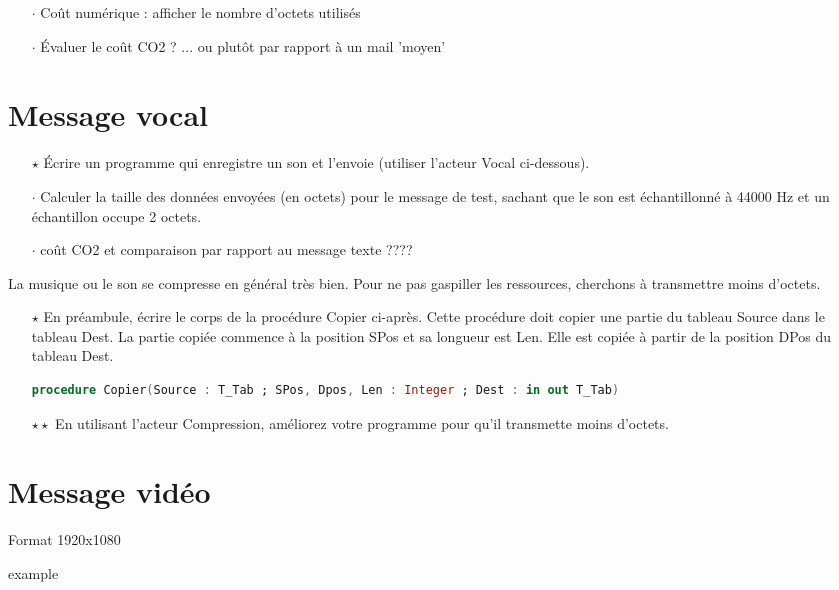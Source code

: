 \documentclass[a4paper]{article}
\begin{document}



\begin{itemize}[itemsep=0.2ex]
\item[$\cdot$] Coût numérique : afficher le nombre d'octets utilisés
\item[$\cdot$] Évaluer le coût CO2 ? ... ou plutôt par rapport à un mail  'moyen'
\end{itemize}

\section{Message vocal}

\begin{itemize}
\item[$\star$] Écrire un programme qui enregistre un son et l'envoie (utiliser l'acteur Vocal ci-dessous).
\item[$\cdot$] Calculer la taille des données envoyées (en octets) pour le message de test, sachant que le son est échantillonné à 44000 Hz et un échantillon occupe 2 octets.
\item[$\cdot$] coût CO2 et comparaison par rapport au message texte ????
\end{itemize}

La musique ou le son se compresse en général très bien. Pour ne pas gaspiller les ressources, cherchons à transmettre moins d'octets.

\begin{itemize}
\item[$\star$] En préambule, écrire le corps de la procédure Copier ci-après. Cette procédure doit copier une partie du tableau Source dans le tableau Dest.
  La partie copiée commence à la position SPos et sa longueur est Len. Elle est copiée à partir de la position DPos du tableau Dest.

  \begin{lstlisting}[language=Ada]
    procedure Copier(Source : T_Tab ; SPos, Dpos, Len : Integer ; Dest : in out T_Tab) 
  \end{lstlisting}
  
  \item[$\star\star$] En utilisant l'acteur Compression, améliorez votre programme pour qu'il transmette moins d'octets.
  \end{itemize}





\section{Message vidéo}



Format 1920x1080


 example
\end{document}
